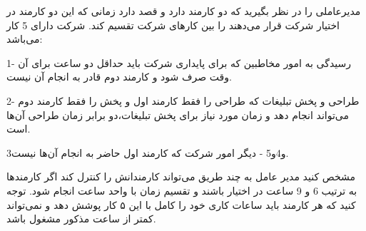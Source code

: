 \p
مدیرعاملی را در نظر بگیرید که دو کارمند دارد و قصد دارد زمانی که این دو کارمند در اختیار شرکت قرار می‌دهند را بین کار‌های شرکت تقسیم کند. شرکت دارای 5 کار می‌باشد:

1- رسیدگی به امور مخاطبین که برای پایداری شرکت باید حداقل دو ساعت برای آن وقت صرف شود و کارمند دوم قادر به انجام آن نیست.

2- طراحی و پخش تبلیغات که طراحی را فقط کارمند اول و پخش را فقط کارمند دوم می‌تواند انجام دهد و زمان مورد نیاز برای پخش تبلیغات،دو برابر زمان طراحی آن‌ها است.

3و4و5 - دیگر امور شرکت که کارمند اول حاضر به انجام آن‌ها نیست.

\p
مشخص کنید مدیر عامل به چند طریق می‌تواند کارمندانش را کنترل کند اگر کارمند‌ها به ترتیب 6 و 9 ساعت در اختیار باشند و تقسیم زمان با واحد ساعت انجام شود.
توجه کنید که هر کارمند باید ساعات کاری خود را کامل با این ۵ کار پوشش دهد و نمی‌تواند کمتر از ساعت مذکور مشغول باشد.
